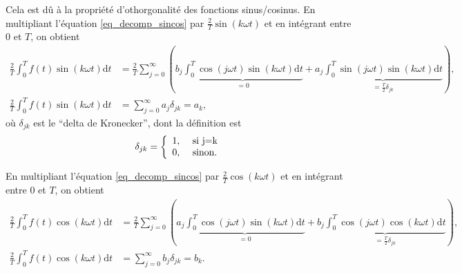 \documentclass[a4paper,12pt]{book}
\newcommand{\dd}{\mathrm{d}}
\renewcommand{\eqref}[1]{\ref{#1}}
\begin{document}
Cela est dû à la propriété d'othorgonalité des fonctions sinus/cosinus.
En multipliant l'équation \eqref{eq_decomp_sincos} par $\frac{2}{T}\sin(k \omega t)$ et en intégrant 
entre $0$ et $T$, on obtient
 \begin{align}
\frac{2}{T}\int_0^T f(t)\sin(k\omega t)\dd t&=\frac{2}{T}\sum_{j=0}^\infty \left(b_j\underbrace{\int_0^T\cos(j\omega t)\sin(k\omega t)\dd t}_{=0}+a_j\underbrace{\int_0^T\sin(j\omega t)\sin(k \omega t)\dd t}_{=\frac{T}{2}\delta_{jk}}\right),\nonumber\\
\frac{2}{T}\int_0^T f(t)\sin(k\omega t)\dd t&=\sum_{j=0}^\infty a_j \delta_{jk}=a_k,
\end{align}
où $\delta_{jk}$ est le ``delta de Kronecker'', dont la définition est
\begin{equation}
 \delta_{jk}=\left\{\begin{array}{ll}
                $1,$&$\mbox{ si }j=k$\\
                $0,$&$\mbox{ sinon.}$
               \end{array}\right.
\end{equation}

En multipliant l'équation \eqref{eq_decomp_sincos} par $\frac{2}{T}\cos(k \omega t)$ et en intégrant 
entre $0$ et $T$, on obtient
 \begin{align}
\frac{2}{T}\int_0^T f(t)\cos(k\omega t)\dd t&=\frac{2}{T}\sum_{j=0}^\infty \left(a_j\underbrace{\int_0^T\cos(j\omega t)\sin(k\omega t)\dd t}_{=0}+b_j\underbrace{\int_0^T\cos(j\omega t)\cos(k \omega t)\dd t}_{=\frac{T}{2}\delta_{jk}}\right),\nonumber\\
\frac{2}{T}\int_0^T f(t)\cos(k\omega t)\dd t&=\sum_{j=0}^\infty b_j \delta_{jk}=b_k.
\end{align}
\end{document}
